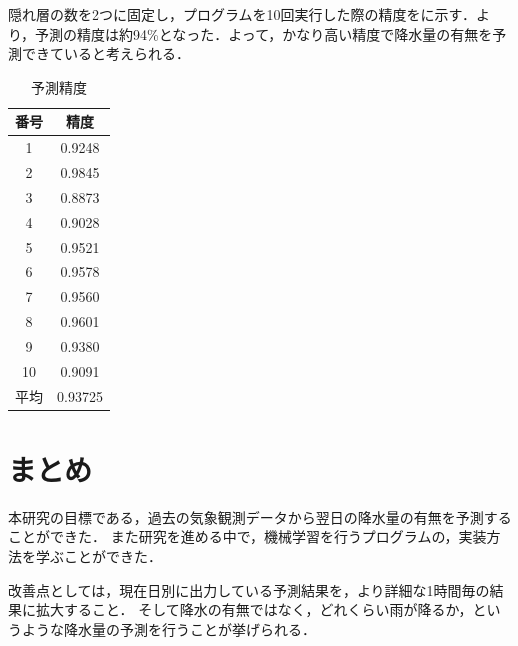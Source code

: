 \documentclass{eithesis}
\begin{document}
  隠れ層の数を2つに固定し，プログラムを10回実行した際の精度をに示す．より，予測の精度は約94\%となった．よって，かなり高い精度で降水量の有無を予測できていると考えられる．
  \begin{table}[htbp]
    \centering
    \caption{予測精度}
    \label{tab_acc}
    \begin{tabular}[htbp]{c|c}
      番号 & 精度 \\ \hline
      1 & 0.9248 \\
      2 & 0.9845 \\
      3 & 0.8873 \\
      4 & 0.9028 \\
      5 & 0.9521 \\
      6 & 0.9578 \\
      7 & 0.9560 \\
      8 & 0.9601 \\
      9 & 0.9380 \\
      10 & 0.9091 \\ \hline
      平均 & 0.93725
    \end{tabular}
  \end{table}

\chapter{まとめ}
  本研究の目標である，過去の気象観測データから翌日の降水量の有無を予測することができた．
  また研究を進める中で，機械学習を行うプログラムの，実装方法を学ぶことができた．

  改善点としては，現在日別に出力している予測結果を，より詳細な1時間毎の結果に拡大すること．
  そして降水の有無ではなく，どれくらい雨が降るか，というような降水量の予測を行うことが挙げられる．

\end{document}
